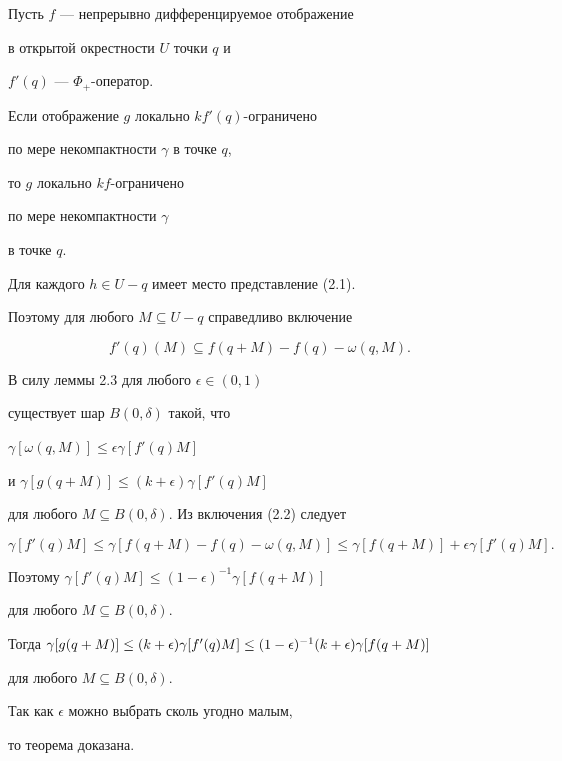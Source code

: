\begin{thms}


Пусть $f$ --- непрерывно дифференцируемое отображение 


в открытой окрестности $U$ точки $q$ и


$f' (q)$ --- $\Phi_+$-оператор.


Если отображение $g$ локально $k f' (q)$-ограничено 


по мере некомпактности $\gamma$ в точке $q$,


то $g$ локально $k f$-ограничено 


по мере некомпактности $\gamma$ 


в точке $ q $.


\end{thms}





\begin{pf}


Для каждого $h \in U - q$ имеет место представление (2.1).


Поэтому для любого $M \subseteq U - q$ справедливо включение


\begin{equation}


f' (q) (M) \subseteq f(q +M) - f(q) - \omega (q,M).


\end{equation}





В силу леммы 2.3 для любого $\epsilon\in (0,1)$


существует шар $B(0,\delta)$ такой, что 


$\gamma [\omega (q,M)] \leq \epsilon \gamma [f' (q) M]$


и $\gamma [g (q + M)] \leq (k + \epsilon) \gamma [f' (q) M]$


для любого $ M \subseteq B (0,\delta)$. Из включения (2.2) следует 


$$


\gamma [f' (q) M] \leq\gamma [f (q + M) - 


f(q)- \omega (q, M)]\leq \gamma [f (q + M)] + 


\epsilon \gamma [f' (q) M].


$$


Поэтому $\gamma [f' (q) M] \leq 


(1 - \epsilon)^{-1} \gamma [f (q + M)]$


для любого $M \subseteq B (0,\delta)$.


Тогда $\gamma [g(q+M)]\leq\linebreak (k+\epsilon) \gamma [f'(q) M] \leq


(1 - \epsilon)^{-1} (k + \epsilon) \gamma [f (q + M)]$


для любого $M \subseteq B (0,\delta)$.


Так как $\epsilon$ можно выбрать сколь угодно малым,


то теорема доказана.


\end{pf}





